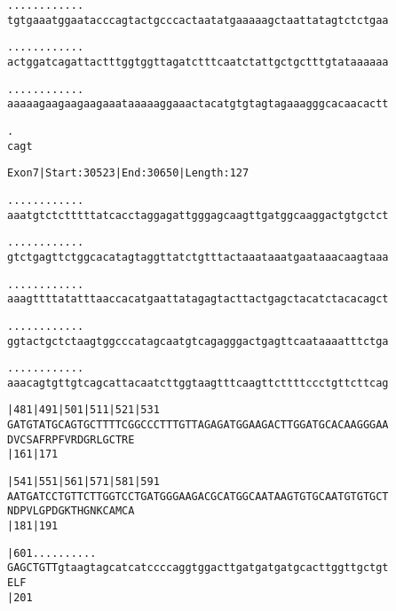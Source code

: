 \documentclass{article}
\begin{document}
\newpage
\begin{alltt}
   .    .    .    .    .    .    .    .    .    .    .    .
tgtgaaatggaatacccagtactgcccactaatatgaaaaagctaattatagtctctgaa



   .    .    .    .    .    .    .    .    .    .    .    .
actggatcagattactttggtggttagatctttcaatctattgctgctttgtataaaaaa



   .    .    .    .    .    .    .    .    .    .    .    .
aaaaagaagaagaagaaataaaaaggaaactacatgtgtagtagaaagggcacaacactt



   .
cagt


\end{alltt}
\newpage
\begin{alltt}
Exon 7 | Start: 30523 | End: 30650 | Length: 127

.    .    .    .    .    .    .    .    .    .    .    .
aaatgtctctttttatcacctaggagattgggagcaagttgatggcaaggactgtgctct



.    .    .    .    .    .    .    .    .    .    .    .
gtctgagttctggcacatagtaggttatctgtttactaaataaatgaataaacaagtaaa



.    .    .    .    .    .    .    .    .    .    .    .
aaagttttatatttaaccacatgaattatagagtacttactgagctacatctacacagct



.    .    .    .    .    .    .    .    .    .    .    .
ggtactgctctaagtggcccatagcaatgtcagagggactgagttcaataaaatttctga



.    .    .    .    .    .    .    .    .    .    .    .
aaacagtgttgtcagcattacaatcttggtaagtttcaagttcttttccctgttcttcag



      |481      |491      |501      |511      |521      |531
GATGTATGCAGTGCTTTTCGGCCCTTTGTTAGAGATGGAAGACTTGGATGCACAAGGGAA
D  V  C  S  A  F  R  P  F  V  R  D  G  R  L  G  C  T  R  E
      |161                          |171

      |541      |551      |561      |571      |581      |591
AATGATCCTGTTCTTGGTCCTGATGGGAAGACGCATGGCAATAAGTGTGCAATGTGTGCT
N  D  P  V  L  G  P  D  G  K  T  H  G  N  K  C  A  M  C  A
      |181                          |191

      |601  .    .    .    .    .    .    .    .    .    .
GAGCTGTTgtaagtagcatcatccccaggtggacttgatgatgatgcacttggttgctgt
E  L  F
      |201

\end{alltt}
\end{document}
